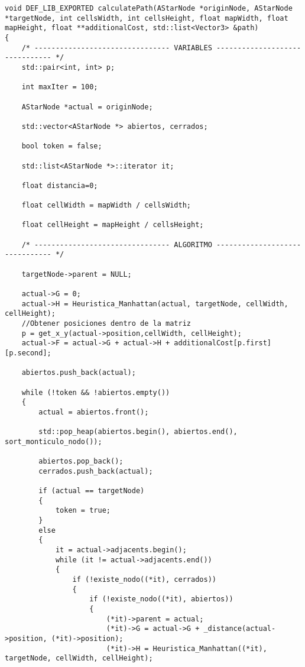 \begin{lstlisting}
void DEF_LIB_EXPORTED calculatePath(AStarNode *originNode, AStarNode *targetNode, int cellsWidth, int cellsHeight, float mapWidth, float mapHeight, float **additionalCost, std::list<Vector3> &path)
{
    /* -------------------------------- VARIABLES ------------------------------- */
    std::pair<int, int> p;
    
    int maxIter = 100;
    
    AStarNode *actual = originNode;
    
    std::vector<AStarNode *> abiertos, cerrados;
    
    bool token = false;
    
    std::list<AStarNode *>::iterator it;
    
    float distancia=0;
    
    float cellWidth = mapWidth / cellsWidth;
    
    float cellHeight = mapHeight / cellsHeight;

    /* -------------------------------- ALGORITMO ------------------------------- */
    
    targetNode->parent = NULL;

    actual->G = 0;
    actual->H = Heuristica_Manhattan(actual, targetNode, cellWidth, cellHeight);
    //Obtener posiciones dentro de la matriz
    p = get_x_y(actual->position,cellWidth, cellHeight);
    actual->F = actual->G + actual->H + additionalCost[p.first][p.second];

    abiertos.push_back(actual);

    while (!token && !abiertos.empty())
    {
        actual = abiertos.front();
        
        std::pop_heap(abiertos.begin(), abiertos.end(), sort_monticulo_nodo());

        abiertos.pop_back();
        cerrados.push_back(actual);
        
        if (actual == targetNode)
        {
            token = true;
        }
        else
        {
            it = actual->adjacents.begin();
            while (it != actual->adjacents.end())
            {
                if (!existe_nodo((*it), cerrados))
                {
                    if (!existe_nodo((*it), abiertos))
                    {
                        (*it)->parent = actual;
                        (*it)->G = actual->G + _distance(actual->position, (*it)->position);
                        (*it)->H = Heuristica_Manhattan((*it), targetNode, cellWidth, cellHeight);
                        

\end{lstlisting}
